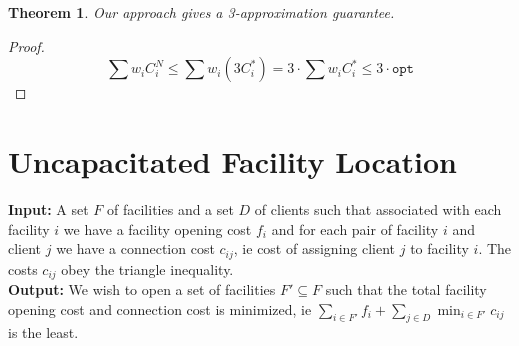 \documentclass[10pt]{article}
\newtheorem{theorem}{Theorem}[section]
\numberwithin{equation}{section}
\begin{document}
\begin{theorem}
Our approach gives a 3-approximation guarantee.
\end{theorem}
\begin{proof}
\[
\sum w_iC_i^N \leq \sum w_i(3C_i^*) = 3 \cdot \sum w_iC_i^* \leq 3 \cdot \texttt{opt}
\]
\end{proof}


\section{Uncapacitated Facility Location}
\textbf{Input: }A set $F$ of facilities and a set $D$ of clients such that associated with each facility $i$ we have a facility opening cost $f_i$ and for each pair of facility $i$ and client $j$ we have a connection cost $c_{ij}$, ie cost of assigning client $j$ to facility $i$. The costs $c_{ij}$ obey the triangle inequality. \\
\textbf{Output: }We wish to open a set of facilities $F' \subseteq F$ such that the total facility opening cost and connection cost is minimized, ie $\sum_{i \in F'}f_i + \sum_{j \in D}\min_{i \in F'}c_{ij}$ is the least. \\
\end{document}
